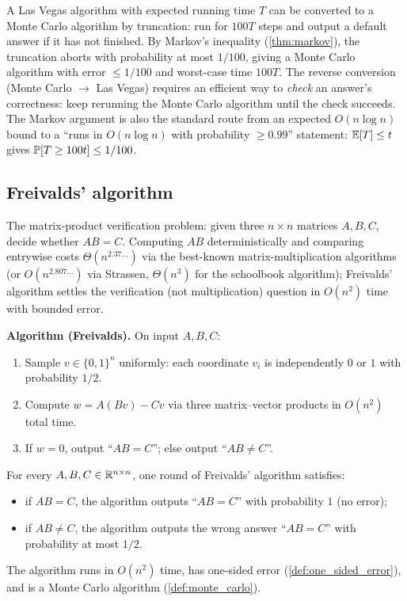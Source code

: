 \begin{remark}
A Las Vegas algorithm with expected running time $T$ can be converted to a Monte Carlo algorithm by truncation: run for $100T$ steps and output a default answer if it has not finished. By Markov's inequality (\cref{thm:markov}), the truncation aborts with probability at most $1/100$, giving a Monte Carlo algorithm with error $\le 1/100$ and worst-case time $100T$. The reverse conversion (Monte Carlo $\to$ Las Vegas) requires an efficient way to \emph{check} an answer's correctness: keep rerunning the Monte Carlo algorithm until the check succeeds. The Markov argument is also the standard route from an expected $O(n \log n)$ bound to a ``runs in $O(n \log n)$ with probability $\ge 0.99$'' statement: $\operatorname{\mathbb{E}}[T] \le t$ gives $\operatorname{\mathbb{P}}[T \ge 100t] \le 1/100$.
\end{remark}

\subsection{Freivalds' algorithm}

The matrix-product verification problem: given three $n \times n$ matrices $A, B, C$, decide whether $AB = C$. Computing $AB$ deterministically and comparing entrywise costs $\Theta(n^{2.37\dots})$ via the best-known matrix-multiplication algorithms (or $O(n^{2.807\dots})$ via Strassen, $\Theta(n^3)$ for the schoolbook algorithm); Freivalds' algorithm settles the verification (not multiplication) question in $O(n^2)$ time with bounded error.

\medskip
\noindent\textbf{Algorithm (Freivalds).} On input $A, B, C$:
\begin{enumerate}[(1)]
  \item Sample $v \in \{0, 1\}^n$ uniformly: each coordinate $v_i$ is independently $0$ or $1$ with probability $1/2$.
  \item Compute $w = A(Bv) - Cv$ via three matrix--vector products in $O(n^2)$ total time.
  \item If $w = 0$, output ``$AB = C$''; else output ``$AB \ne C$''.
\end{enumerate}

\begin{theorem}
\label{thm:freivalds}
For every $A, B, C \in \mathbb{R}^{n \times n}$, one round of Freivalds' algorithm satisfies:
\begin{itemize}
  \item if $AB = C$, the algorithm outputs ``$AB = C$'' with probability $1$ (no error);
  \item if $AB \ne C$, the algorithm outputs the wrong answer ``$AB = C$'' with probability at most $1/2$.
\end{itemize}
The algorithm runs in $O(n^2)$ time, has one-sided error (\cref{def:one_sided_error}), and is a Monte Carlo algorithm (\cref{def:monte_carlo}).
\end{theorem}

